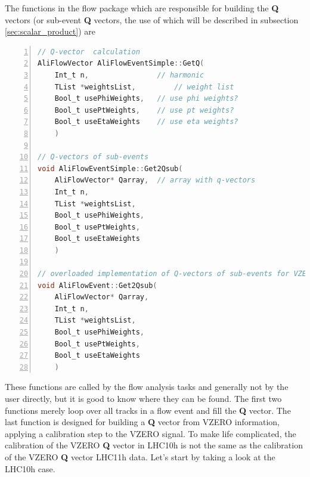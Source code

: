 \documentclass[a4paper]{book}
\numberwithin{equation}{subsection}
\begin{document}
The functions in the flow package which are responsible for building the \textbf{Q} vectors (or sub-event \textbf{Q} vectors, the use of which will be described in subsection \ref{sec:scalar_product}) are
\begin{lstlisting}[language=C, numbers=left]
// Q-vector  calculation
AliFlowVector AliFlowEventSimple::GetQ( 
    Int_t n, 				// harmonic
    TList *weightsList, 		// weight list
    Bool_t usePhiWeights, 	// use phi weights?
    Bool_t usePtWeights, 	// use pt weights?
    Bool_t useEtaWeights 	// use eta weights?
    )

// Q-vectors of sub-events
void AliFlowEventSimple::Get2Qsub( 
	AliFlowVector* Qarray, 	// array with q-vectors
    Int_t n, 
    TList *weightsList, 
    Bool_t usePhiWeights, 
    Bool_t usePtWeights, 
    Bool_t useEtaWeights 
    )

// overloaded implementation of Q-vectors of sub-events for VZERO information
void AliFlowEvent::Get2Qsub(
	AliFlowVector* Qarray, 
	Int_t n, 
	TList *weightsList, 
	Bool_t usePhiWeights, 
	Bool_t usePtWeights, 
	Bool_t useEtaWeights
	)\end{lstlisting}
These functions are called by the flow analysis tasks and generally not by the user directly, but it is good to know where they can be found. The first two functions merely loop over all tracks in a flow event and fill the \textbf{Q} vector. The last function is designed for building a \textbf{Q} vector from VZERO information, applying a calibration step to the VZERO signal. To make life complicated, the calibration of the VZERO \textbf{Q} vector in LHC10h is not the same as the calibration of the VZERO \textbf{Q} vector LHC11h data. Let's start by taking a look at the LHC10h case. 
\end{document}
